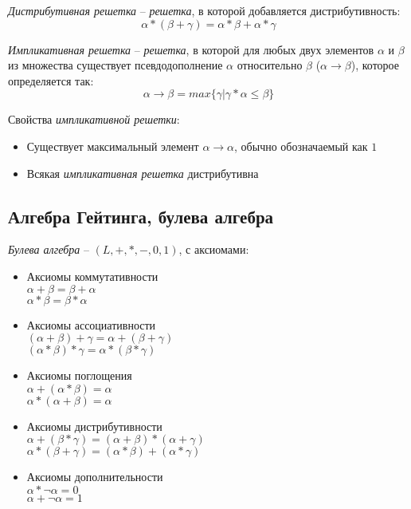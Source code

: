 \emph{Дистрибутивная решетка} -- \emph{решетка}, в которой добавляется дистрибутивность:
\[\alpha * (\beta + \gamma) = \alpha * \beta + \alpha * \gamma\]

\emph{Импликативная решетка} -- \emph{решетка}, в которой для любых двух элементов $\alpha$ и $\beta$ из множества существует псевдодополнение $\alpha$ относительно $\beta$ ($\alpha \rightarrow \beta$), которое определяется так:
\[\alpha \rightarrow \beta = max \lbrace \gamma \vert \gamma * \alpha \leq \beta \rbrace\]

Свойства \emph{импликативной решетки}:
\begin{itemize}
\item Существует максимальный элемент $\alpha \rightarrow \alpha$, обычно обозначаемый как $1$
\item Всякая \emph{импликативная решетка} дистрибутивна
\end{itemize}

\subsection{Алгебра Гейтинга, булева алгебра}
\label{sec-5-4}
\emph{Булева алгебра} -- $(L, +, *, -, 0, 1)$, с аксиомами:
\begin{itemize}
\item Аксиомы коммутативности\\
$\alpha + \beta = \beta + \alpha$\\
$\alpha * \beta = \beta * \alpha$
\item Аксиомы ассоциативности\\
$(\alpha + \beta) + \gamma = \alpha + (\beta + \gamma)$\\
$(\alpha * \beta) * \gamma = \alpha * (\beta * \gamma)$
\item Аксиомы поглощения\\
$\alpha + (\alpha * \beta) = \alpha$\\
$\alpha * (\alpha + \beta) = \alpha$
\item Аксиомы дистрибутивности\\
$\alpha + (\beta * \gamma) = (\alpha + \beta) * (\alpha + \gamma)$\\
$\alpha * (\beta + \gamma) = (\alpha * \beta) + (\alpha * \gamma)$
\item Аксиомы дополнительности\\
$\alpha * \neg \alpha = 0$\\
$\alpha + \neg \alpha = 1$
\end{itemize}

